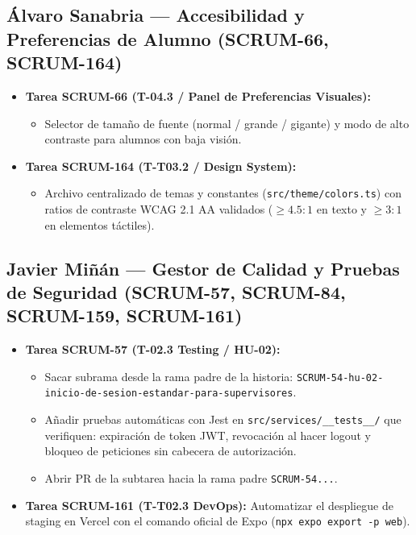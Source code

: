 \documentclass[10.5pt,a4paper]{article}
\begin{document}
\subsection{Álvaro Sanabria --- Accesibilidad y Preferencias de Alumno (SCRUM-66, SCRUM-164)}
\begin{itemize}[leftmargin=*,itemsep=2pt]
    \item \textbf{Tarea SCRUM-66 (T-04.3 / Panel de Preferencias Visuales):}
    \begin{itemize}[leftmargin=*]
        \item Selector de tamaño de fuente (normal / grande / gigante) y modo de alto contraste para alumnos con baja visión.
    \end{itemize}
    \item \textbf{Tarea SCRUM-164 (T-T03.2 / Design System):}
    \begin{itemize}[leftmargin=*]
        \item Archivo centralizado de temas y constantes (\texttt{src/theme/colors.ts}) con ratios de contraste WCAG 2.1 AA validados ($\ge 4.5:1$ en texto y $\ge 3:1$ en elementos táctiles).
    \end{itemize}
\end{itemize}

\subsection{Javier Miñán --- Gestor de Calidad y Pruebas de Seguridad (SCRUM-57, SCRUM-84, SCRUM-159, SCRUM-161)}
\begin{itemize}[leftmargin=*,itemsep=2pt]
    \item \textbf{Tarea SCRUM-57 (T-02.3 Testing / HU-02):}
    \begin{itemize}[leftmargin=*]
        \item Sacar subrama desde la rama padre de la historia: \texttt{SCRUM-54-hu-02-inicio-de-sesion-estandar-para-supervisores}.
        \item Añadir pruebas automáticas con Jest en \texttt{src/services/\_\_tests\_\_/} que verifiquen: expiración de token JWT, revocación al hacer logout y bloqueo de peticiones sin cabecera de autorización.
        \item Abrir PR de la subtarea hacia la rama padre \texttt{SCRUM-54...}.
    \end{itemize}
    \item \textbf{Tarea SCRUM-161 (T-T02.3 DevOps):} Automatizar el despliegue de staging en Vercel con el comando oficial de Expo (\texttt{npx expo export -p web}).
\end{itemize}
\end{document}
